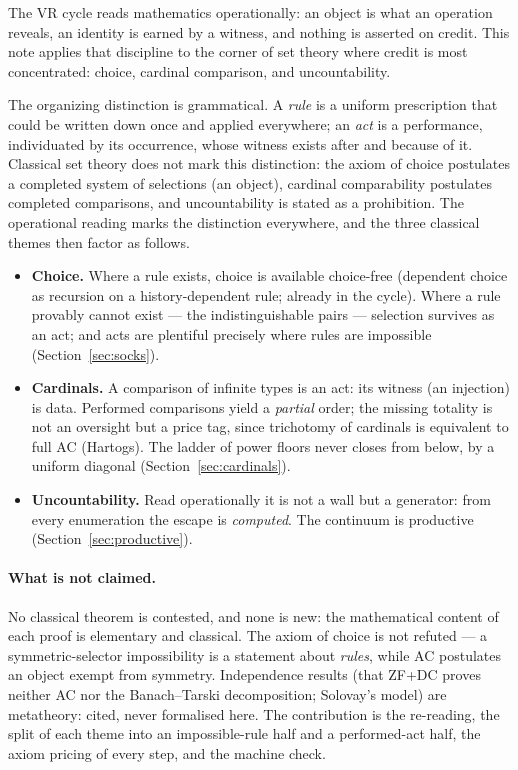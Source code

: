 \documentclass[11pt]{article}
\theoremstyle{remark}
\begin{document}
The VR cycle reads mathematics operationally: an object is what an
operation reveals, an identity is earned by a witness, and nothing is
asserted on credit.  This note applies that discipline to the corner of
set theory where credit is most concentrated: choice, cardinal
comparison, and uncountability.

The organizing distinction is grammatical.  A \emph{rule} is a uniform
prescription that could be written down once and applied everywhere; an
\emph{act} is a performance, individuated by its occurrence, whose
witness exists after and because of it.  Classical set theory does not
mark this distinction: the axiom of choice postulates a completed system
of selections (an object), cardinal comparability postulates completed
comparisons, and uncountability is stated as a prohibition.  The
operational reading marks the distinction everywhere, and the three
classical themes then factor as follows.

\begin{itemize}
\item \textbf{Choice.}  Where a rule exists, choice is available
  choice-free (dependent choice as recursion on a history-dependent
  rule; already in the cycle).  Where a rule provably cannot exist ---
  the indistinguishable pairs --- selection survives as an act; and acts
  are plentiful precisely where rules are impossible
  (Section~\ref{sec:socks}).
\item \textbf{Cardinals.}  A comparison of infinite types is an act:
  its witness (an injection) is data.  Performed comparisons yield a
  \emph{partial} order; the missing totality is not an oversight but a
  price tag, since trichotomy of cardinals is equivalent to full AC
  (Hartogs).  The ladder of power floors never closes from below, by a
  uniform diagonal (Section~\ref{sec:cardinals}).
\item \textbf{Uncountability.}  Read operationally it is not a wall but
  a generator: from every enumeration the escape is \emph{computed}.
  The continuum is productive (Section~\ref{sec:productive}).
\end{itemize}

\paragraph{What is not claimed.}  No classical theorem is contested, and
none is new: the mathematical content of each proof is elementary and
classical.  The axiom of choice is not refuted --- a symmetric-selector
impossibility is a statement about \emph{rules}, while AC postulates an
object exempt from symmetry.  Independence results (that ZF+DC proves
neither AC nor the Banach--Tarski decomposition; Solovay's model) are
metatheory: cited, never formalised here.  The contribution is the
re-reading, the split of each theme into an impossible-rule half and a
performed-act half, the axiom pricing of every step, and the machine
check.
\end{document}
